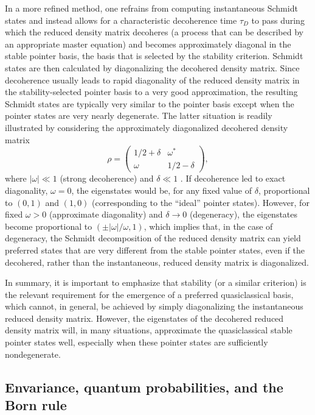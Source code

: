 \documentclass[rmp,aps,amsmath,amsfonts,noshowkeys,noshowpacs,12pt]{revtex4}
\begin{document}
In a more refined method, one refrains from computing instantaneous
Schmidt states and instead allows for a characteristic decoherence
time $\tau_D$ to pass during which the reduced density matrix
decoheres (a process that can be described by an appropriate master
equation) and becomes approximately diagonal in the stable pointer
basis, the basis that is selected by the stability criterion.  Schmidt
states are then calculated by diagonalizing the decohered density
matrix.  Since decoherence usually leads to rapid diagonality of the
reduced density matrix in the stability-selected pointer basis to a
very good approximation, the resulting Schmidt states are typically
very similar to the pointer basis except when the pointer states are
very nearly degenerate. The latter situation is readily illustrated by
considering the approximately diagonalized decohered density matrix
%
\begin{equation} 
\rho = \left( \begin{array}{cc}
    1/2 + \delta & \omega^* \\
    \omega & 1/2 - \delta
\end{array} \right),
\end{equation}
%
where $|\omega| \ll 1$ (strong decoherence) and $\delta \ll 1$
\citep[near-degeneracy;][]{Albrecht:1993:pq}. If decoherence led to
exact diagonality, $\omega = 0$, the eigenstates would be, for any
fixed value of $\delta$, proportional to $(0,1)$ and $(1,0)$
(corresponding to the ``ideal'' pointer states).  However, for fixed
$\omega > 0$ (approximate diagonality) and $\delta \rightarrow 0$
(degeneracy), the eigenstates become proportional to $(\pm
|\omega| / \omega, 1)$, which implies that, in the case of
degeneracy, the Schmidt decomposition of the reduced density matrix can
yield preferred states that are very different from the stable pointer
states, even if the decohered, rather than the instantaneous, reduced
density matrix is diagonalized.

In summary, it is important to emphasize that stability (or a similar
criterion) is the relevant requirement for the emergence of a
preferred quasiclassical basis, which cannot, in general, be achieved
by simply diagonalizing the instantaneous reduced density matrix.
However, the eigenstates of the decohered reduced density matrix will,
in many situations, approximate the quasiclassical stable pointer
states well, especially when these pointer states are sufficiently
nondegenerate.


\subsection{Envariance, quantum probabilities, and the Born rule \label{sec:envar}}
\end{document}
